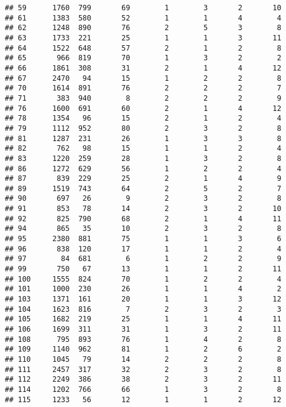 \documentclass[]{article}
\begin{document}
\begin{verbatim}
## 59      1760  799       69        1        3       2       10
## 61      1383  580       52        1        1       4        4
## 62      1248  890       76        2        5       3        8
## 63      1733  221       25        1        1       3       11
## 64      1522  648       57        2        1       2        8
## 65       966  819       70        1        3       2        2
## 66      1861  308       31        2        1       4       12
## 67      2470   94       15        1        2       2        8
## 70      1614  891       76        2        2       2        7
## 71       383  940        8        2        2       2        9
## 76      1600  691       60        2        1       4       12
## 78      1354   96       15        2        1       2        4
## 79      1112  952       80        2        3       2        8
## 81      1287  231       26        1        3       3        8
## 82       762   98       15        1        1       2        4
## 83      1220  259       28        1        3       2        8
## 86      1272  629       56        1        2       2        4
## 87       839  229       25        2        1       4        9
## 89      1519  743       64        2        5       2        7
## 90       697   26        9        2        3       2        8
## 91       853   78       14        2        3       2       10
## 92       825  790       68        2        1       4       11
## 94       865   35       10        2        3       2        8
## 95      2380  881       75        1        1       3        6
## 96       838  120       17        1        1       2        4
## 97        84  681        6        1        2       2        9
## 99       750   67       13        1        1       2       11
## 100     1555  824       70        1        2       2        4
## 101     1000  230       26        1        1       4        2
## 103     1371  161       20        1        1       3       12
## 104     1623  816        7        2        3       2        3
## 105     1682  219       25        1        1       4       11
## 106     1699  311       31        1        3       2       11
## 108      795  893       76        1        4       2        8
## 109     1140  962       81        1        2       6        2
## 110     1045   79       14        2        2       2        8
## 111     2457  317       32        2        3       2        8
## 112     2249  386       38        2        3       2       11
## 114     1202  766       66        1        3       2        8
## 115     1233   56       12        1        1       2       12

\end{verbatim}
\end{document}
